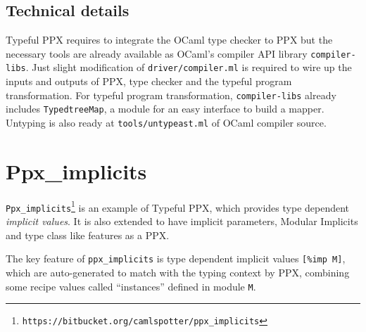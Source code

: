 \documentclass{article}
\begin{document}
\subsection{Technical details}\label{technical-details}

Typeful PPX requires to integrate the OCaml type checker to PPX
but the necessary tools are already available as OCaml's compiler API
library \texttt{compiler-libs}. Just slight modification of
\texttt{driver/compiler.ml} is required to wire up the inputs and
outputs of PPX, type checker and the typeful program transformation.
For typeful program transformation, \texttt{compiler-libs} already
includes \texttt{TypedtreeMap}, a module for an easy interface to build
a mapper. 
Untyping is also ready at
\texttt{tools/untypeast.ml} of OCaml compiler source.

\section{Ppx\_implicits}\label{ppxux5fimplicits}

\texttt{Ppx\_implicits}\footnote{ \texttt{https://bitbucket.org/camlspotter/ppx\_implicits} } is an example of Typeful
PPX, which provides type dependent \emph{implicit values}. It is also
extended to have implicit parameters\cite{scalaimplicits}, Modular Implicits\cite{ocamlimplicits}
and type class\cite{typeclass} like features as a PPX.


The key feature of \texttt{ppx\_implicits} is type dependent
implicit values \texttt{[\%imp M]}, which are auto-generated
to match with the typing context by PPX, combining some recipe values 
called ``instances'' defined in module \texttt{M}.
\end{document}
